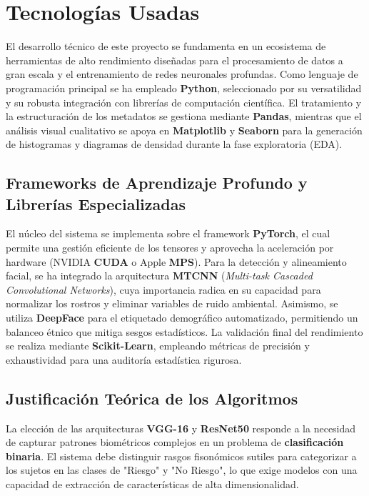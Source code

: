 \section{Tecnologías Usadas}

El desarrollo técnico de este proyecto se fundamenta en un ecosistema de herramientas de alto rendimiento diseñadas para el procesamiento de datos a gran escala y el entrenamiento de redes neuronales profundas. Como lenguaje de programación principal se ha empleado \textbf{Python}, seleccionado por su versatilidad y su robusta integración con librerías de computación científica. El tratamiento y la estructuración de los metadatos se gestiona mediante \textbf{Pandas}, mientras que el análisis visual cualitativo se apoya en \textbf{Matplotlib} y \textbf{Seaborn} para la generación de histogramas y diagramas de densidad durante la fase exploratoria (EDA).

\subsection{Frameworks de Aprendizaje Profundo y Librerías Especializadas}

El núcleo del sistema se implementa sobre el framework \textbf{PyTorch}, el cual permite una gestión eficiente de los tensores y aprovecha la aceleración por hardware (NVIDIA \textbf{CUDA} o Apple \textbf{MPS}). Para la detección y alineamiento facial, se ha integrado la arquitectura \textbf{MTCNN} (\textit{Multi-task Cascaded Convolutional Networks}), cuya importancia radica en su capacidad para normalizar los rostros y eliminar variables de ruido ambiental. Asimismo, se utiliza \textbf{DeepFace} para el etiquetado demográfico automatizado, permitiendo un balanceo étnico que mitiga sesgos estadísticos. La validación final del rendimiento se realiza mediante \textbf{Scikit-Learn}, empleando métricas de precisión y exhaustividad para una auditoría estadística rigurosa.

\subsection{Justificación Teórica de los Algoritmos}

La elección de las arquitecturas \textbf{VGG-16} y \textbf{ResNet50} responde a la necesidad de capturar patrones biométricos complejos en un problema de \textbf{clasificación binaria}. El sistema debe distinguir rasgos fisonómicos sutiles para categorizar a los sujetos en las clases de "Riesgo" y "No Riesgo", lo que exige modelos con una capacidad de extracción de características de alta dimensionalidad.

